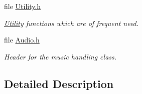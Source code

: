 \begin{DoxyCompactItemize}
file \hyperlink{_utility_8h}{Utility.\-h}
\begin{DoxyCompactList}\small\item\em \hyperlink{namespace_utility}{Utility} functions which are of frequent need. \end{DoxyCompactList}\item 
file \hyperlink{_audio_8h}{Audio.\-h}
\begin{DoxyCompactList}\small\item\em Header for the music handling class. \end{DoxyCompactList}\end{DoxyCompactItemize}


\subsection{Detailed Description}
